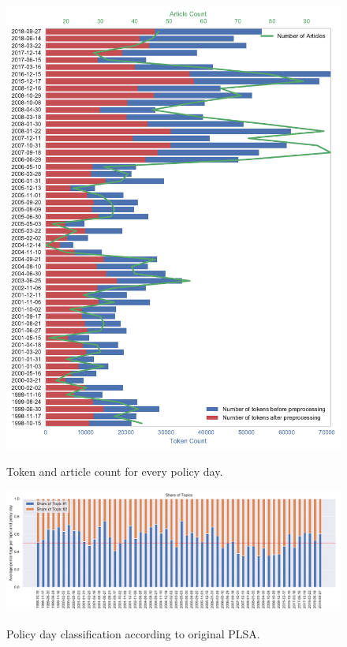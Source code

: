 \documentclass[11pt,a4paper,english,oneside]{book}
\numberwithin{equation}{chapter}
\begin{document}
\begin{figure}
	\caption{Token and article count for every policy day.}
	\centering
	\includegraphics[scale=1]{Images/tokencount.pdf}
	\label{tokencount}
\end{figure}

\begin{figure}
	\caption{Policy day classification according to original PLSA.}
	\centering
	\includegraphics[scale=0.8]{Images/plsamodelling_orig.pdf}
	\label{classPLSA}
\end{figure}
\end{document}
